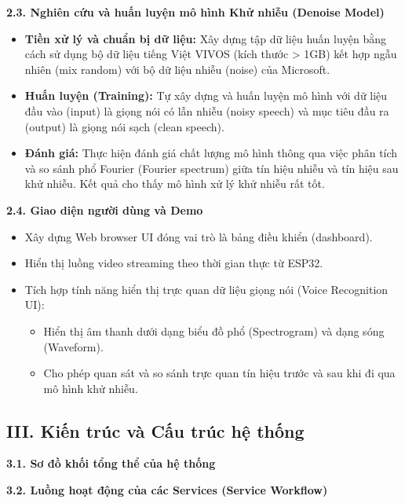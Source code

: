 \documentclass[
  13pt,
]{article}
\begin{document}
\textbf{2.3. Nghiên cứu và huấn luyện mô hình Khử nhiễu (Denoise Model)}

\begin{itemize}
\item
  \textbf{Tiền xử lý và chuẩn bị dữ liệu:} Xây dựng tập dữ liệu huấn
  luyện bằng cách sử dụng bộ dữ liệu tiếng Việt VIVOS (kích thước
  \textgreater{} 1GB) kết hợp ngẫu nhiên (mix random) với bộ dữ liệu
  nhiễu (noise) của Microsoft.
\item
  \textbf{Huấn luyện (Training):} Tự xây dựng và huấn luyện mô hình với
  dữ liệu đầu vào (input) là giọng nói có lẫn nhiễu (noisy speech) và
  mục tiêu đầu ra (output) là giọng nói sạch (clean speech).
\item
  \textbf{Đánh giá:} Thực hiện đánh giá chất lượng mô hình thông qua
  việc phân tích và so sánh phổ Fourier (Fourier spectrum) giữa tín hiệu
  nhiễu và tín hiệu sau khử nhiễu. Kết quả cho thấy mô hình xử lý khử
  nhiễu rất tốt.
\end{itemize}

\textbf{2.4. Giao diện người dùng và Demo}

\begin{itemize}
\item
  Xây dựng Web browser UI đóng vai trò là bảng điều khiển (dashboard).
\item
  Hiển thị luồng video streaming theo thời gian thực từ ESP32.
\item
  Tích hợp tính năng hiển thị trực quan dữ liệu giọng nói (Voice
  Recognition UI):

  \begin{itemize}
  \item
    Hiển thị âm thanh dưới dạng biểu đồ phổ (Spectrogram) và dạng sóng
    (Waveform).
  \item
    Cho phép quan sát và so sánh trực quan tín hiệu trước và sau khi đi
    qua mô hình khử nhiễu.
  \end{itemize}
\end{itemize}

\subsection{\texorpdfstring{\textbf{III. Kiến trúc và Cấu trúc hệ
thống}}{III. Kiến trúc và Cấu trúc hệ thống}}\label{iii.-kiux1ebfn-truxfac-vuxe0-cux1ea5u-truxfac-hux1ec7-thux1ed1ng}

\textbf{3.1. Sơ đồ khối tổng thể của hệ thống}

\textbf{3.2. Luồng hoạt động của các Services (Service Workflow)}
\end{document}
